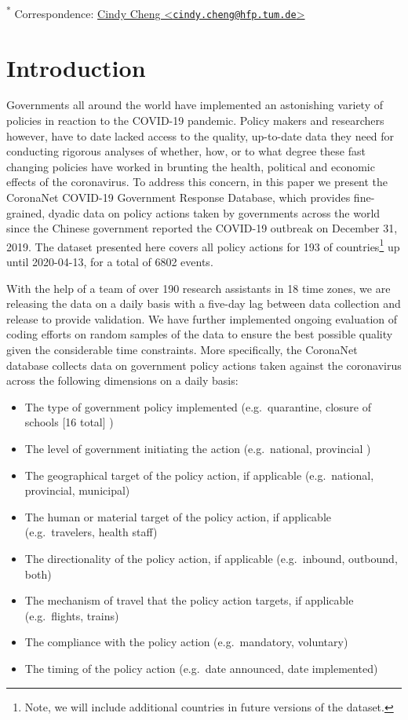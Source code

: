 \documentclass[]{article}
\providecommand{\tightlist}{%
  \setlength{\itemsep}{0pt}\setlength{\parskip}{0pt}}
\let\rmarkdownfootnote\footnote%
\def\footnote{\protect\rmarkdownfootnote}
\begin{document}
\textsuperscript{*} Correspondence: \href{mailto:cindy.cheng@hfp.tum.de}{Cindy Cheng \textless{}\href{mailto:cindy.cheng@hfp.tum.de}{\nolinkurl{cindy.cheng@hfp.tum.de}}\textgreater{}}

\hypertarget{introduction}{%
\section{Introduction}\label{introduction}}

Governments all around the world have implemented an astonishing variety of policies in reaction to the COVID-19 pandemic. Policy makers and researchers however, have to date lacked access to the quality, up-to-date data they need for conducting rigorous analyses of whether, how, or to what degree these fast changing policies have worked in brunting the health, political and economic effects of the coronavirus. To address this concern, in this paper we present the CoronaNet COVID-19 Government Response Database, which provides fine-grained, dyadic data on policy actions taken by governments across the world since the Chinese government reported the COVID-19 outbreak on December 31, 2019. The dataset presented here covers all policy actions for 193 of countries\footnote{Note, we will include additional countries in future versions of the dataset.} up until 2020-04-13, for a total of 6802 events.

With the help of a team of over 190 research assistants in 18 time zones, we are releasing the data on a daily basis with a five-day lag between data collection and release to provide validation. We have further implemented ongoing evaluation of coding efforts on random samples of the data to ensure the best possible quality given the considerable time constraints. More specifically, the CoronaNet database collects data on government policy actions taken against the coronavirus across the following dimensions on a daily basis:

\begin{itemize}
\tightlist
\item
  The type of government policy implemented (e.g.~quarantine, closure of schools {[}16 total{]} )
\item
  The level of government initiating the action (e.g.~national, provincial )
\item
  The geographical target of the policy action, if applicable (e.g.~national, provincial, municipal)
\item
  The human or material target of the policy action, if applicable (e.g.~travelers, health staff)
\item
  The directionality of the policy action, if applicable (e.g.~inbound, outbound, both)
\item
  The mechanism of travel that the policy action targets, if applicable (e.g.~flights, trains)
\item
  The compliance with the policy action (e.g.~mandatory, voluntary)
\item
  The timing of the policy action (e.g.~date announced, date implemented)
\end{itemize}
\end{document}
